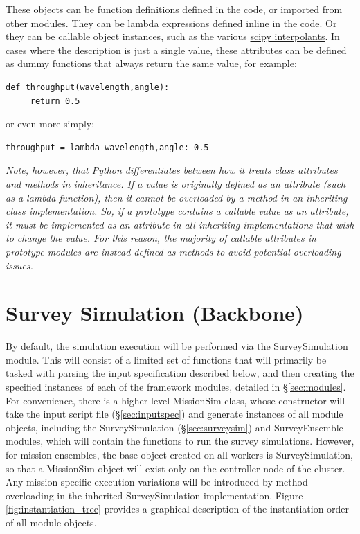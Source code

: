 \documentclass[cleanfoot]{asme2ej}
\newcommand{\reffig}[1]{Figure \ref{#1}}
\begin{document}
These objects can be function definitions defined in the code, or imported from other modules.  They can be \href{https://docs.python.org/2/reference/expressions.html#lambda}{lambda expressions} defined inline in the code.  Or they can be callable object instances, such as the various \href{http://docs.scipy.org/doc/scipy/reference/interpolate.html}{scipy interpolants}.  In cases where the description is just a single value, these attributes can be defined as dummy functions that always return the same value, for example:
\begin{verbatim}
def throughput(wavelength,angle):
     return 0.5
\end{verbatim}
or even more simply:
\begin{verbatim}
throughput = lambda wavelength,angle: 0.5
\end{verbatim}

\emph{Note, however, that Python differentiates between how it treats class attributes and methods in inheritance. If a value is originally defined as an attribute (such as a lambda function), then it cannot be overloaded by a method in an inheriting class implementation.  So, if a prototype contains a callable value as an attribute, it must be implemented as an attribute in all inheriting implementations that wish to change the value.  For this reason, the majority of callable attributes in prototype modules are instead defined as methods to avoid potential overloading issues.}


\section{Survey Simulation (Backbone)}
By default, the simulation execution will be performed via the SurveySimulation module.  This will consist of a limited set of functions that will primarily be tasked with parsing the input specification described below, and then creating the specified instances of each of the framework modules, detailed in \S\ref{sec:modules}.  For convenience, there is a higher-level \mbox{MissionSim} class, whose constructor will take the input script file (\S\ref{sec:inputspec}) and generate instances of all module objects, including the SurveySimulation (\S\ref{sec:surveysim}) and SurveyEnsemble modules, which will contain the functions to run the survey simulations. However, for mission ensembles, the base object created on all workers is SurveySimulation, so that a MissionSim object will exist only on the controller node of the cluster.  Any mission-specific execution variations will be introduced by method overloading in the inherited SurveySimulation implementation. \reffig{fig:instantiation_tree} provides a graphical description of the instantiation order of all module objects.
\end{document}
